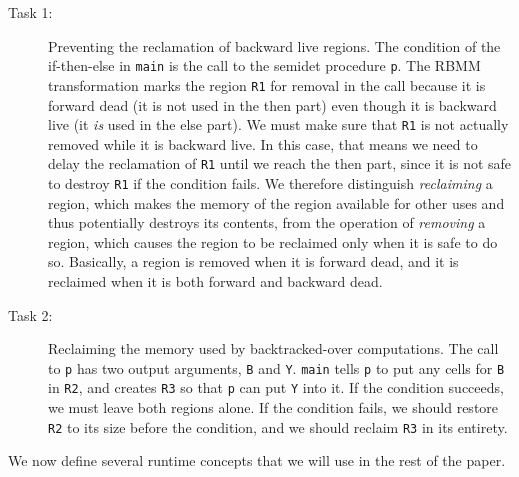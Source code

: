 \documentclass{tlp}
\newcommand{\code}[1]{{\tt#1}}
\begin{document}
\begin{description}
\item[Task 1:]
    Preventing the reclamation of backward live regions.
    The condition of the if-then-else in \code{main}
    is the call to the semidet procedure \code{p}.
    The RBMM transformation marks the region \code{R1} for removal in the call
    because it is forward dead (it is not used in the then part)
    even though it is backward live (it \emph{is} used in the else part).
    We must make sure that \code{R1} is not actually removed
    while it is backward live.
    In this case, that means we need to delay
    the reclamation of \code{R1} until we reach the then part,
    since it is not safe to destroy \code{R1} if the condition fails.
    We therefore distinguish \emph{reclaiming} a region,
    which makes the memory of the region available for other uses
    and thus potentially destroys its contents,
    from the operation of \emph{removing} a region,
    which causes the region to be reclaimed only when it is safe to do so.
    Basically, a region is removed when it is forward dead,
    and it is reclaimed when it is both forward and backward dead.

\item[Task 2:]
    Reclaiming the memory used by backtracked-over computations.
    The call to \code{p} has two output arguments, \code{B} and \code{Y}.
    \code{main} tells \code{p} to put any cells for \code{B} in \code{R2},
    and creates \code{R3} so that \code{p} can put \code{Y} into it.
    If the condition succeeds, we must leave both regions alone.
    If the condition fails,
    we should restore \code{R2} to its size before the condition,
    and we should reclaim \code{R3} in its entirety.
\end{description}

We now define several runtime concepts
that we will use in the rest of the paper.
\end{document}
